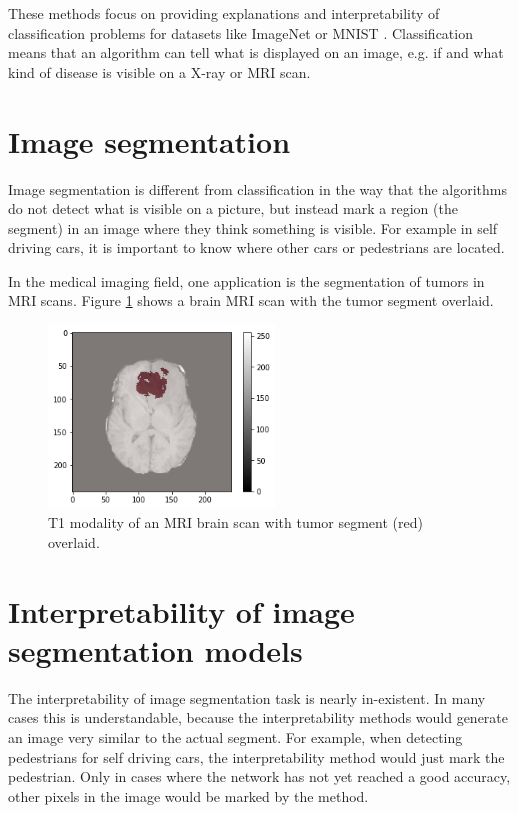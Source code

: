 These methods focus on providing explanations and interpretability of classification problems for datasets like ImageNet \cite{imagenet_cvpr09} or MNIST \cite{lecun1998gradient}. Classification means that an algorithm can tell what is displayed on an image, e.g. if and what kind of disease is visible on a X-ray or MRI scan.

\section{Image segmentation}
Image segmentation is different from classification in the way that the algorithms do not detect what is visible on a picture, but instead mark a region (the segment) in an image where they think something is visible. For example in self driving cars, it is important to know where other cars or pedestrians are located. 

In the medical imaging field, one application is the segmentation of tumors in MRI scans. Figure \ref{introduction_tumor} shows a brain MRI scan with the tumor segment overlaid.

\begin{figure}[h]
\centering
\includegraphics[width=6cm]{chapters/01_introduction/images/tumor_segment.png}
\caption{T1 modality of an MRI brain scan with tumor segment (red) overlaid.}
\label{introduction_tumor}
\end{figure}


\section{Interpretability of image segmentation models}
The interpretability of image segmentation task is nearly in-existent. In many cases this is understandable, because the interpretability methods would generate an image very similar to the actual segment. For example, when detecting pedestrians for self driving cars, the interpretability method would just mark the pedestrian. Only in cases where the network has not yet reached a good accuracy, other pixels in the image would be marked by the method.


